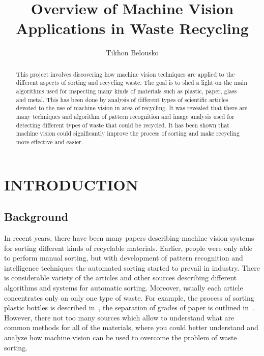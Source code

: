 \documentclass{lutmscthesis}[2010/09/22]
\title{Overview of Machine Vision Applications in Waste Recycling}
\author{Tikhon Belousko}
\begin{document}


\maketitle
\newpage


\begin{abstract}

This project involves discovering how machine vision techniques are applied
to the different aspects of sorting and recycling waste. The goal is to shed
a light on the main algorithms used for inspecting many kinds of materials such
as plastic, paper, glass and metal. This has been done by analysis of different
types of scientific articles devoted to the use of machine vision in area of
recycling. It was revealed that there are many techniques and algorithm of
pattern recognition and image analysis used for detecting different types
of waste that could be recycled. It has been shown that machine vision
could significantly improve the process of sorting and make recycling
more effective and easier.

\end{abstract}


\renewcommand\refname{REFERENCES}
\renewcommand\contentsname{CONTENTS}
\newpage

\tableofcontents

\section{ INTRODUCTION }
\setlength{\parskip}{3ex}

\subsection{ Background }
In recent years, there have been many papers describing
machine vision systems for sorting different kinds
of recyclable materials. Earlier, people were only
able to perform manual sorting, but with
development of pattern recognition and intelligence
techniques the automated sorting started to prevail
in industry. There is considerable variety of the
articles and other sources describing different
algorithms and systems for automatic sorting. Moreover,
usually each article concentrates only on only one
type of waste. For example, the process of sorting
plastic bottles is described in~\cite{Wahab:2006}, the
separation of grades of paper is outlined
in~\cite{Rahman:2009}. However, there not too many
sources which allow to understand what are common
methods for all of the materials, where
you could better understand and analyze how machine
vision can be used to overcome the problem
of waste sorting.
\end{document}
